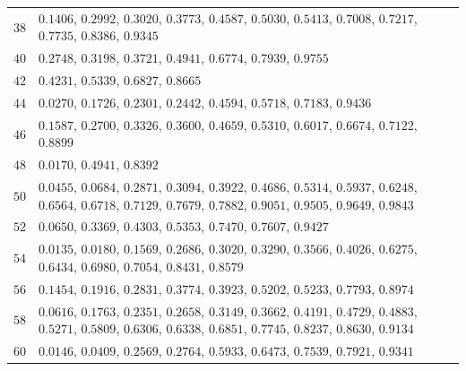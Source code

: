 \begin{table}[htbp]
\begin{tabular}{rl}
$38$ & $0.1406$, $0.2992$, $0.3020$, $0.3773$, $0.4587$, $0.5030$, $0.5413$, $0.7008$, $0.7217$, $0.7735$, $0.8386$, $0.9345$ \\
$40$ & $0.2748$, $0.3198$, $0.3721$, $0.4941$, $0.6774$, $0.7939$, $0.9755$ \\
$42$ & $0.4231$, $0.5339$, $0.6827$, $0.8665$ \\
$44$ & $0.0270$, $0.1726$, $0.2301$, $0.2442$, $0.4594$, $0.5718$, $0.7183$, $0.9436$ \\
$46$ & $0.1587$, $0.2700$, $0.3326$, $0.3600$, $0.4659$, $0.5310$, $0.6017$, $0.6674$, $0.7122$, $0.8899$ \\
$48$ & $0.0170$, $0.4941$, $0.8392$ \\
$50$ & $0.0455$, $0.0684$, $0.2871$, $0.3094$, $0.3922$, $0.4686$, $0.5314$, $0.5937$, $0.6248$, $0.6564$, $0.6718$, $0.7129$, $0.7679$, $0.7882$, $0.9051$, $0.9505$, $0.9649$, $0.9843$ \\
$52$ & $0.0650$, $0.3369$, $0.4303$, $0.5353$, $0.7470$, $0.7607$, $0.9427$ \\
$54$ & $0.0135$, $0.0180$, $0.1569$, $0.2686$, $0.3020$, $0.3290$, $0.3566$, $0.4026$, $0.6275$, $0.6434$, $0.6980$, $0.7054$, $0.8431$, $0.8579$ \\
$56$ & $0.1454$, $0.1916$, $0.2831$, $0.3774$, $0.3923$, $0.5202$, $0.5233$, $0.7793$, $0.8974$ \\
$58$ & $0.0616$, $0.1763$, $0.2351$, $0.2658$, $0.3149$, $0.3662$, $0.4191$, $0.4729$, $0.4883$, $0.5271$, $0.5809$, $0.6306$, $0.6338$, $0.6851$, $0.7745$, $0.8237$, $0.8630$, $0.9134$ \\
$60$ & $0.0146$, $0.0409$, $0.2569$, $0.2764$, $0.5933$, $0.6473$, $0.7539$, $0.7921$, $0.9341$ \\
\bottomrule
\end{tabular}
\end{table}